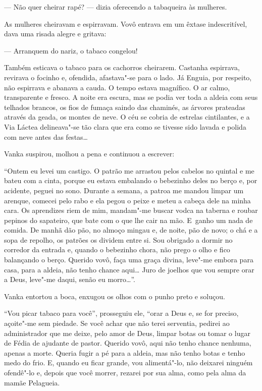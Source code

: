 
--- Não quer cheirar rapé? --- dizia oferecendo a tabaqueira às
mulheres.

As mulheres cheiravam e espirravam. Vovô entrava em um êxtase
indescritível, dava uma risada alegre e gritava:

--- Arranquem do nariz, o tabaco congelou!

Também esticava o tabaco para os cachorros cheirarem. Castanha
espirrava, revirava o focinho e, ofendida, afastava"-se para o lado. Já
Enguia, por respeito, não espirrava e abanava a cauda. O tempo estava
magnífico. O ar calmo, transparente e fresco. A noite era escura, mas se
podia ver toda a aldeia com seus telhados brancos, os fios de fumaça
saindo das chaminés, as árvores prateadas através da geada, os montes de neve.
O céu se cobria de estrelas cintilantes, e a Via Láctea delineava"-se tão
clara que era como se tivesse sido lavada e polida com neve antes das
festas\ldots{}

Vanka suspirou, molhou a pena e continuou a escrever:

``Ontem eu levei um castigo. O patrão me arrastou pelos cabelos no
quintal e me bateu com a cinta, porque eu estava embalando o bebezinho
deles no berço e, por acidente, peguei no sono. Durante a semana, a
patroa me mandou limpar um arenque, comecei pelo rabo e ela pegou o
peixe e meteu a cabeça dele na minha cara. Os aprendizes riem de mim,
mandam"-me buscar vodca na taberna e roubar pepinos do sapateiro, que
bate com o que lhe cair na mão. E~ganho um nada de comida. De manhã dão
pão, no almoço mingau e, de noite, pão de novo; o chá e a sopa de
repolho, os patrões os dividem entre si. Sou obrigado a dormir no corredor da
entrada e, quando o bebezinho chora, não prego o olho e fico
balançando o berço. Querido vovô, faça uma graça divina, leve"-me embora
para casa, para a aldeia, não tenho chance aqui\ldots{} Juro de joelhos que
vou sempre orar a Deus, leve"-me daqui, senão eu morro\ldots{}''.

Vanka entortou a boca, enxugou os olhos com o punho preto e soluçou.

``Vou picar tabaco para você'', prosseguiu ele, ``orar a Deus e, se for
preciso, açoite"-me sem piedade. Se você achar que não terei serventia,
pedirei ao administrador que me deixe, pelo amor de Deus, limpar botas
ou tomar o lugar de Fédia de ajudante de pastor. Querido vovô, aqui não
tenho chance nenhuma, apenas a morte. Queria fugir a pé para a aldeia,
mas não tenho botas e tenho medo do frio. E, quando eu ficar grande, vou
alimentá"-lo, não deixarei ninguém ofendê"-lo e, depois que você morrer,
rezarei por sua alma, como pela alma da mamãe Pelagueia.


